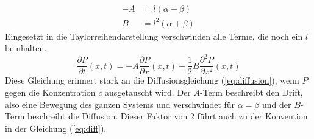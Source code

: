 \begin{align}
  - A & = l (\alpha - \beta) \\
  B & = l^2 (\alpha + \beta)
\end{align}
Eingesetzt in die Taylorreihendarstellung verschwinden alle Terme, die noch ein $l$ beinhalten.
\begin{equation}
  \frac{\partial P}{\partial t} (x, t) = - A \frac{\partial P}{\partial x}(x, t) + \frac{1}{2} B \frac{\partial^2 P}{\partial x^2} (x, t)
\end{equation}
Diese Gleichung erinnert stark an die Diffusionsgleichung (\ref{eq:diffusion}), wenn $P$ gegen die Konzentration $c$ ausgetauscht wird. Der $A$-Term beschreibt den Drift, also eine Bewegung des ganzen Systems und verschwindet für $\alpha = \beta$ und der $B$-Term beschreibt die Diffusion. Dieser Faktor von 2 führt auch zu der Konvention in der Gleichung (\ref{eq:diff}).
